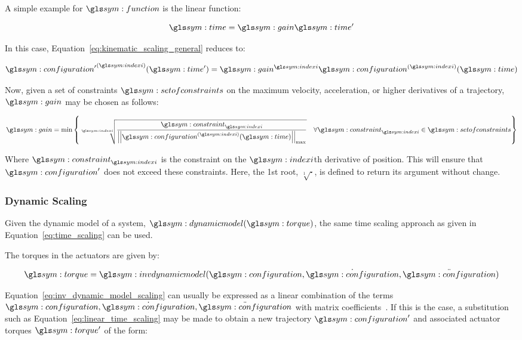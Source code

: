 			A simple example for $\function$ is the linear function:

			\begin{equation}
				\timesym = \gain\timesym'
				\label{eq:linear_time_scaling}
			\end{equation}

			In this case, Equation~\ref{eq:kinematic_scaling_general} reduces
			to:

			\begin{equation}
				\tdern{\configuration'}{\indexi}(\timesym') = \gain^{\indexi}
					\tdern{\configuration}{\indexi}(\timesym)
			\end{equation}

			Now, given a set of constraints $\setofconstraints$ on the maximum
			velocity, acceleration, or higher derivatives of a trajectory,
			$\gain$ may be chosen as follows:

			\begin{equation}
				\gain = \min
					\left\{
						\sqrt[\indexi]
						{%
							\frac
							{%
								\constraint_{\indexi}
							}
							{%
									\norm
									{%
										\tdern{\configuration}{\indexi}(\timesym)
									}_{\max}
							}
						}
						\quad
						\forall \constraint_{\indexi} \in \setofconstraints
					\right\}
			\end{equation}

			Where $\constraint_{\indexi}$ is the constraint on the $\indexi$th
			derivative of position. This will ensure that $\configuration'$ does
			not exceed these constraints. Here, the 1st root, $\sqrt[1]{\cdot}$,
			is defined to return its argument without change.

		\subsubsection{Dynamic Scaling}%
		\label{sec:dynamic_scaling}

			Given the dynamic model of a system, $\dynamicmodel(\torque)$, the
			same time scaling approach as given in
			Equation~\ref{eq:time_scaling} can be used.

			The torques in the actuators are given by:

			\begin{equation}
				\torque = \invdynamicmodel(\configuration, \dot{\configuration},
					\ddot{\configuration})
				\label{eq:inv_dynamic_model_scaling}
			\end{equation}

			Equation~\ref{eq:inv_dynamic_model_scaling} can usually be expressed
			as a linear combination of the terms $\configuration,
			\dot{\configuration}, \ddot{\configuration}$ with matrix
			coefficients~\cite{bib:traj:trajectory_planning_for_automatic_machines_and_robots}.
			If this is the case, a substitution such as
			Equation~\ref{eq:linear_time_scaling} may be made to obtain a new
			trajectory $\configuration'$ and associated actuator torques
			$\torque'$ of the form:

